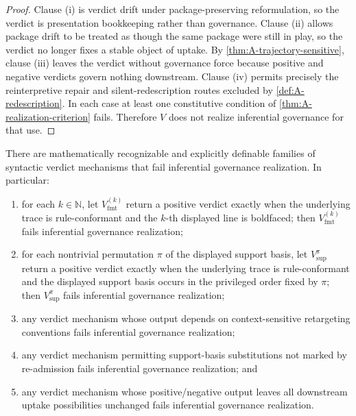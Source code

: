 \begin{proof}
Clause (i) is verdict drift under package-preserving reformulation, so the verdict is presentation bookkeeping rather than governance. Clause (ii) allows package drift to be treated as though the same package were still in play, so the verdict no longer fixes a stable object of uptake. By \cref{thm:A-trajectory-sensitive}, clause (iii) leaves the verdict without governance force because positive and negative verdicts govern nothing downstream. Clause (iv) permits precisely the reinterpretive repair and silent-redescription routes excluded by \cref{def:A-redescription}. In each case at least one constitutive condition of \cref{thm:A-realization-criterion} fails. Therefore $V$ does not realize inferential governance for that use.
\end{proof}

\begin{theorem}
\label{thm:A-concrete-failure-family}
There are mathematically recognizable and explicitly definable families of syntactic verdict mechanisms that fail inferential governance realization. In particular:
\begin{enumerate}[label=(\alph*), leftmargin=2.5em]
    \item for each $k\in\mathbb{N}$, let $V^{(k)}_{\mathrm{fmt}}$ return a positive verdict exactly when the underlying trace is rule-conformant and the $k$-th displayed line is boldfaced; then $V^{(k)}_{\mathrm{fmt}}$ fails inferential governance realization;
    \item for each nontrivial permutation $\pi$ of the displayed support basis, let $V^{\pi}_{\mathrm{sup}}$ return a positive verdict exactly when the underlying trace is rule-conformant and the displayed support basis occurs in the privileged order fixed by $\pi$; then $V^{\pi}_{\mathrm{sup}}$ fails inferential governance realization;
    \item any verdict mechanism whose output depends on context-sensitive retargeting conventions fails inferential governance realization;
    \item any verdict mechanism permitting support-basis substitutions not marked by re-admission fails inferential governance realization; and
    \item any verdict mechanism whose positive/negative output leaves all downstream uptake possibilities unchanged fails inferential governance realization.
\end{enumerate}
\end{theorem}

